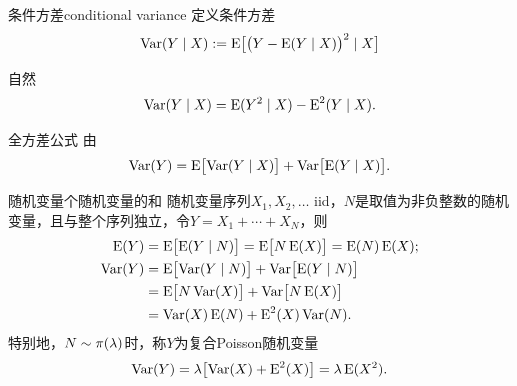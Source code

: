 \begin{definition}{条件方差}{conditional variance}
	定义条件方差
	\begin{equation}
		\Var(Y \mid X) := \E\bigb{\bigp{Y - \E(Y \mid X)}^2 \mid X}
	\end{equation}
\end{definition}
自然
\begin{equation}
	\Var(Y \mid X) = \E(Y^2 \mid X) - \E^2(Y \mid X).
\end{equation}
\begin{theorem}{全方差公式}{}
	由
	\begin{equation}
		\Var(Y) = \E\bigb{\Var(Y \mid X)} + \Var\bigb{\E(Y \mid X)}.
	\end{equation}
\end{theorem}
\begin{example}{随机变量个随机变量的和}{}
	随机变量序列$X_1,X_2,\ldots$ iid，$N$是取值为非负整数的随机变量，且与整个序列独立，令$Y = X_1 + \cdots + X_N$，则
	\begin{subequations}
		\begin{align}
			\E(Y) &= \E\bigb{\E(Y \mid N)} = \E\bigb{N\E(X)} = \E(N)\E(X);\\
			\notag
			\Var(Y) &= \E\bigb{\Var(Y \mid N)} + \Var\bigb{\E(Y \mid N)}\\
			\notag
			&= \E\bigb{N\Var(X)} + \Var\bigb{N\E(X)}\\
			&= \Var(X)\E(N) + \E^2(X)\Var(N).
		\end{align}
	\end{subequations}
	特别地，$N \sim \PoisDist(\lambda)$时，称$Y$为复合Poisson随机变量
	\begin{equation}\label{eq:ps-compound-poisson-variance}
		\Var(Y) = \lambda\bigb{\Var(X) + \E^2(X)} = \lambda\E(X^2).
	\end{equation}
\end{example}
